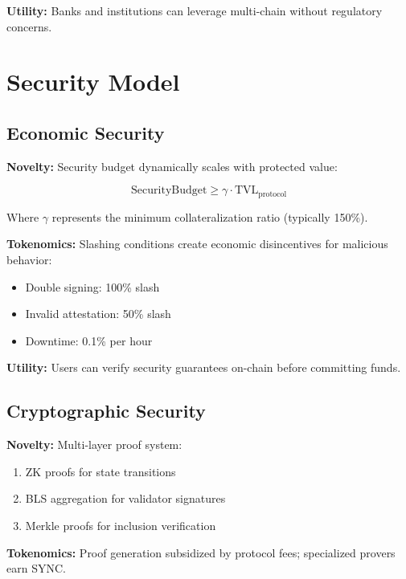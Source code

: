 \documentclass[12pt,a4paper]{article}
\begin{document}
\textbf{Utility:} Banks and institutions can leverage multi-chain without regulatory concerns.

\section{Security Model}

\subsection{Economic Security}

\textbf{Novelty:} Security budget dynamically scales with protected value:

\begin{equation}
\text{SecurityBudget} \geq \gamma \cdot \text{TVL}_{\text{protocol}}
\end{equation}

Where $\gamma$ represents the minimum collateralization ratio (typically 150\%).

\textbf{Tokenomics:} Slashing conditions create economic disincentives for malicious behavior:
\begin{itemize}
    \item Double signing: 100\% slash
    \item Invalid attestation: 50\% slash
    \item Downtime: 0.1\% per hour
\end{itemize}

\textbf{Utility:} Users can verify security guarantees on-chain before committing funds.

\subsection{Cryptographic Security}

\textbf{Novelty:} Multi-layer proof system:
\begin{enumerate}
    \item ZK proofs for state transitions
    \item BLS aggregation for validator signatures
    \item Merkle proofs for inclusion verification
\end{enumerate}

\textbf{Tokenomics:} Proof generation subsidized by protocol fees; specialized provers earn SYNC.
\end{document}
